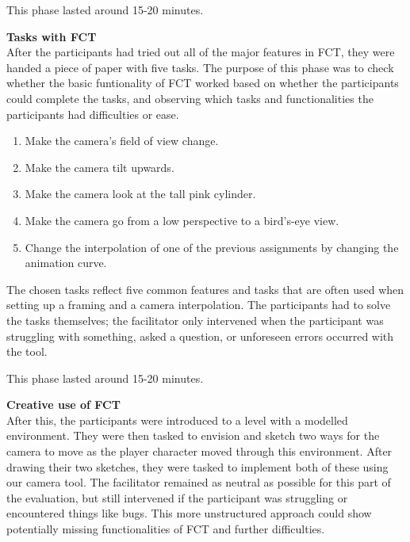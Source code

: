This phase lasted around 15-20 minutes.

\textbf{Tasks with FCT}\\
After the participants had tried out all of the major features in FCT, they were handed a piece of paper with five tasks. The purpose of this phase was to check whether the basic funtionality of FCT worked based on whether the participants could complete the tasks, and observing which tasks and functionalities the participants had difficulties or ease.


\begin{enumerate}
\item Make the camera's field of view change.
\item Make the camera tilt upwards.
\item Make the camera look at the tall pink cylinder.
\item Make the camera go from a low perspective to a bird's-eye view.
\item Change the interpolation of one of the previous assignments by changing the animation curve.
\end{enumerate} 

The chosen tasks reflect five common features and tasks that are often used when setting up a framing and a camera interpolation. The participants had to solve the tasks themselves; the facilitator only intervened when the participant was struggling with something, asked a question, or unforeseen errors occurred with the tool.

This phase lasted around 15-20 minutes.

\textbf{Creative use of FCT}\\
After this, the participants were introduced to a level with a modelled environment. They were then tasked to envision and sketch two ways for the camera to move as the player character moved through this environment. After drawing their two sketches, they were tasked to implement both of these using our camera tool. The facilitator remained as neutral as possible for this part of the evaluation, but still intervened if the participant was struggling or encountered things like bugs. This more unstructured approach could show potentially missing functionalities of FCT and further difficulties.

